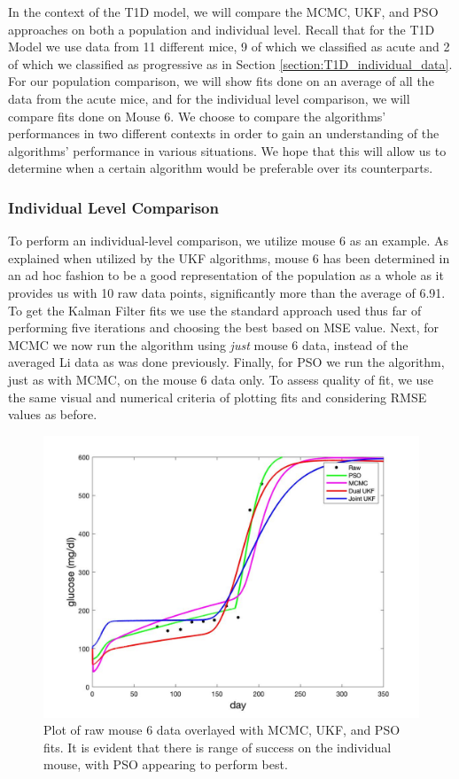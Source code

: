 In the context of the T1D model, we will compare the MCMC, UKF, and PSO approaches on both a population and individual level. Recall that for the T1D Model we use data from 11 different mice, 9 of which we classified as acute and 2 of which we classified as progressive as in Section \ref{section:T1D_individual_data}. For our population comparison, we will show fits done on an average of all the data from the acute mice, and for the individual level comparison, we will compare fits done on Mouse 6. We choose to compare the algorithms' performances in two different contexts in order to gain an understanding of the algorithms' performance in various situations. We hope that this will allow us to determine when a certain algorithm would be preferable over its counterparts.


\subsubsection{Individual Level Comparison}
To perform an individual-level comparison, we utilize mouse 6 as an example. As explained when utilized by the UKF algorithms, mouse 6 has been determined in an ad hoc fashion to be a good representation of the population as a whole as it provides us with 10 raw data points, significantly more than the average of 6.91. To get the Kalman Filter fits we use the standard approach used thus far of performing five iterations and choosing the best based on MSE value. Next, for MCMC we now run the algorithm using \emph{just} mouse 6 data, instead of the averaged Li data as was done previously. Finally, for PSO we run the algorithm, just as with MCMC, on the mouse 6 data only. To assess quality of fit, we use the same visual and numerical criteria of plotting fits and considering RMSE values as before. 
\begin{figure}[H]
    \centering
    \includegraphics[width=15cm]{Comparison_Figures/Mouse6_ComparisonFigure_AllAlgorithms.jpg}
    \caption{Plot of raw mouse 6 data overlayed with MCMC, UKF, and PSO fits. It is evident that there is range of success on the individual mouse, with PSO appearing to perform best.}
    \label{fig:Results_Mouse6_Comparison}
\end{figure}
